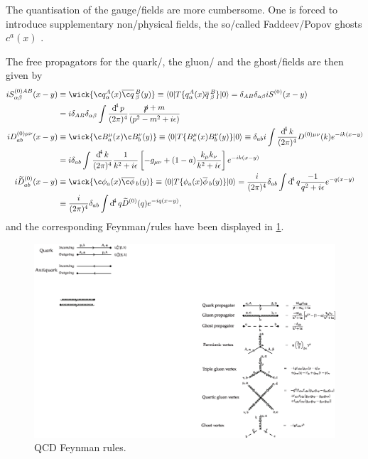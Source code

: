 \documentclass[../../index.tex]{subfiles}
\begin{document}
The quantisation of the gauge\-/fields are more cumbersome. One is forced to
introduce supplementary non\-/physical fields, the so\-/called Faddeev\-/Popov
ghosts $c^a(x)$ \cite{Faddeev1967}.

The free propagators for the quark\-/, the gluon\-/ and the ghost\-/fields are
then given by
\begin{equation}
  \begin{split}
    i S^{(0)AB}_{\alpha\beta}(x-y) &\equiv \wick{ \c q_\alpha^A(x) \anti{\c
        q}_\beta^B(y)} \equiv \langle 0 \vert T \{ q_\alpha^A(x)
    \anti{q}_\beta^B \} \vert 0 \rangle
    = \delta_{AB} \delta_{\alpha\beta} i S^{(0)}(x-y) \\
    &= i \delta_{AB}\delta_{\alpha\beta}\int \fdif{p} \frac{\slashed p + m}{(p^2 - m^2 + i\epsilon)}\\
    i D^{(0)\mu\nu}_{ab}(x-y) &\equiv \wick{ \c B_a^\mu(x) \c B_b^\nu(y)} \equiv
    \langle 0 \vert T \{ B_a^\mu(x) B_b^\nu(y) \} \vert 0 \rangle
    \equiv \delta_{ab}i \int \frac{\dif^4 k}{(2\pi)^4} D^{(0)\mu\nu}(k) e^{-ik(x-y)} \\
    &= i \delta_{ab} \int \frac{\dif^4 k}{(2\pi)^4} \frac{1}{k^2+i\epsilon} \left[ -g_{\mu\nu} + (1-a) \frac{k_\mu k_\nu}{k^2+i\epsilon} \right] e^{-ik(x-y)} \\
    i \widetilde{D}_{ab}^{(0)}(x-y) & \equiv \wick{\c \phi_a(x) \anti{\c
        \phi}_b(y)} \equiv \langle 0 \vert T\{ \phi_a(x) \anti{\phi}_b(y) \}
    \vert 0 \rangle
    = \frac{i}{(2\pi)^4}\delta_{ab} \int \dif^4 q \frac{-1}{q^2 + i\epsilon} e^{-q(x-y)} \\
    &\equiv \frac{i}{(2\pi)^4} \delta_{ab} \int \dif^4 q \widetilde{D}^{(0)}(q)
    e^{-iq(x-y)},
  \end{split}
\end{equation}
and the corresponding Feynman\-/rules have been displayed in
\cref{fig:qcdFeynmanRules}.
\begin{figure}
  \includegraphics[width=\textwidth]{./images/qcdFeynmanRules.eps}
  \caption{QCD Feynman rules.}
  \label{fig:qcdFeynmanRules}
\end{figure}
\end{document}
